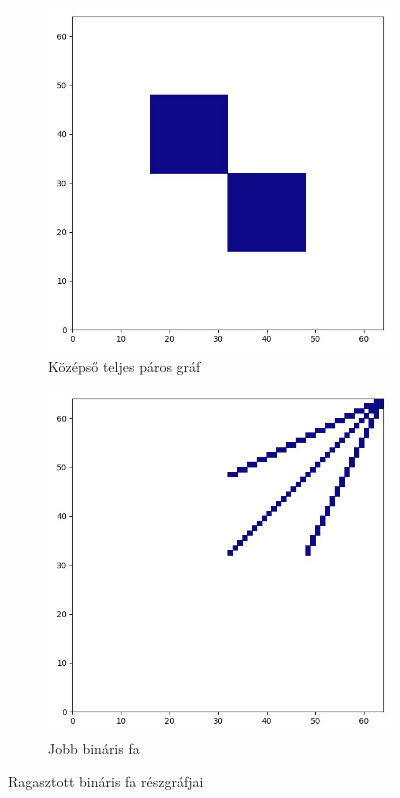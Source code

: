 \begin{figure}[H]
\begin{subfigure}{.3\linewidth}
    \includegraphics[width=\linewidth]{./figures/ragasztott_binaris/subgraph_02.jpg}
    \caption{Középső teljes páros gráf}
  \end{subfigure}
  \begin{subfigure}{.3\linewidth}
    \centering
    \includegraphics[width=\linewidth]{./figures/ragasztott_binaris/subgraph_01.jpg}
    \caption{Jobb bináris fa}
  \end{subfigure}
  \caption{Ragasztott bináris fa részgráfjai}
\end{figure}

